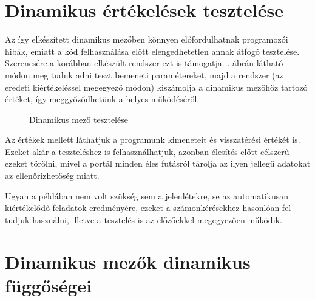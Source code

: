 \section{Dinamikus értékelések tesztelése}
Az így elkészített dinamikus mezőben könnyen előfordulhatnak programozói hibák, emiatt a kód felhasználása előtt elengedhetetlen annak átfogó tesztelése. Szerencsére a korábban elkészült rendszer ezt is támogatja. . ábrán látható módon meg tuduk adni teszt bemeneti paramétereket, majd a rendszer (az eredeti kiértékeléssel megegyező módon) kiszámolja a dinamikus mezőhöz tartozó értéket, így meggyőződhetünk a helyes működéséről.

\begin{figure}[h]
    \centering
    \caption{Dinamikus mező tesztelése}
    \label{fig:jporta_dynamic_test}
\end{figure}

Az értékek mellett láthatjuk a programunk kimeneteit és visszatérési értékét is. Ezeket akár a teszteléshez is felhasználhatjuk, azonban élesítés előtt célszerű ezeket törölni, mivel a portál minden éles futásról tárolja az ilyen jellegű adatokat az ellenőrizhetőség miatt.

Ugyan a példában nem volt szükség sem a jelenlétekre, se az automatikusan kiértékelődő feladatok eredményére, ezeket a számonkérésekhez hasonlóan fel tudjuk használni, illetve a tesztelés is az előzőekkel megegyezően működik.

\section{Dinamikus mezők dinamikus függőségei}